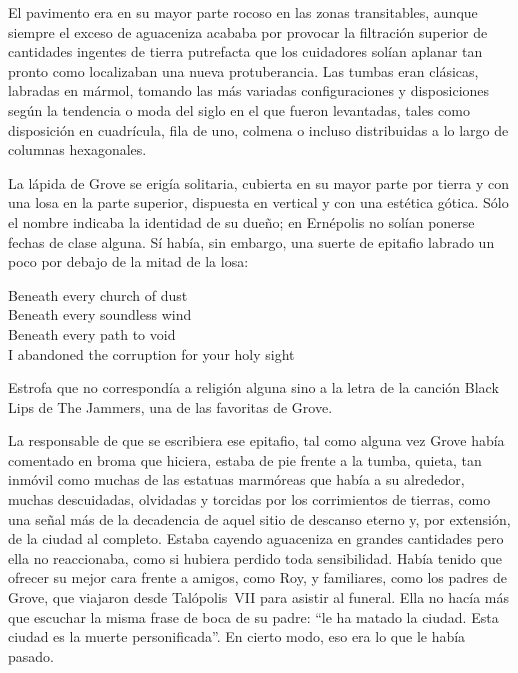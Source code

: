 El pavimento era en su mayor parte rocoso en las zonas transitables, aunque siempre el exceso de aguaceniza acababa por provocar la filtración superior de cantidades ingentes de tierra putrefacta que los cuidadores solían aplanar tan pronto como localizaban una nueva protuberancia. Las tumbas eran clásicas, labradas en mármol, tomando las más variadas configuraciones y disposiciones según la tendencia o moda del siglo en el que fueron levantadas, tales como disposición en cuadrícula, fila de uno, colmena o incluso distribuidas a lo largo de columnas hexagonales.

La lápida de Grove se erigía solitaria, cubierta en su mayor parte por tierra y con una losa en la parte superior, dispuesta en vertical y con una estética gótica. Sólo el nombre indicaba la identidad de su dueño; en Ernépolis no solían ponerse fechas de clase alguna. Sí había, sin embargo, una suerte de epitafio labrado un poco por debajo de la mitad de la losa:

\begin{center}
    \begin{em}
        Beneath every church of dust\\
        Beneath every soundless wind\\
        Beneath every path to void\\
        I abandoned the corruption for your holy sight\\
    \end{em}
\end{center}

Estrofa que no correspondía a religión alguna sino a la letra de la canción Black Lips de The Jammers, una de las favoritas de Grove.

La responsable de que se escribiera ese epitafio, tal como alguna vez Grove había comentado en broma que hiciera, estaba de pie frente a la tumba, quieta, tan inmóvil como muchas de las estatuas marmóreas que había a su alrededor, muchas descuidadas, olvidadas y torcidas por los corrimientos de tierras, como una señal más de la decadencia de aquel sitio de descanso eterno y, por extensión, de la ciudad al completo. Estaba cayendo aguaceniza en grandes cantidades pero ella no reaccionaba, como si hubiera perdido toda sensibilidad. Había tenido que ofrecer su mejor cara frente a amigos, como Roy, y familiares, como los padres de Grove, que viajaron desde Talópolis~VII para asistir al funeral. Ella no hacía más que escuchar la misma frase de boca de su padre: “le ha matado la ciudad. Esta ciudad es la muerte personificada”. En cierto modo, eso era lo que le había pasado.

